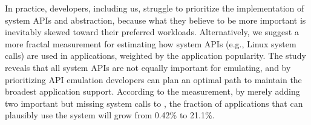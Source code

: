 In practice,
developers, including us, struggle to prioritize the implementation of system APIs and abstraction,
because what they believe to be more important
is inevitably skewed toward their preferred workloads.
Alternatively,
we suggest a more fractal measurement
for estimating how system APIs
(e.g., Linux system calls)
are used in applications,
weighted by the application popularity.
The study reveals that all system APIs are not equally important for emulating,
and by prioritizing API emulation
developers can plan an optimal path to maintain the broadest application support.
According to the measurement,
by merely adding two important but missing system calls to \graphene{},
the fraction of applications that can plausibly use the system
will grow from 0.42\% to 21.1\%.



